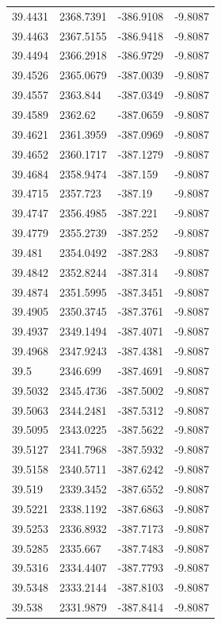 \begin{table}[H]
\begin{tabular}{llll}
39.4431 & 2368.7391 & -386.9108 & -9.8087 \\
39.4463 & 2367.5155 & -386.9418 & -9.8087 \\
39.4494 & 2366.2918 & -386.9729 & -9.8087 \\
39.4526 & 2365.0679 & -387.0039 & -9.8087 \\
39.4557 & 2363.844 & -387.0349 & -9.8087 \\
39.4589 & 2362.62 & -387.0659 & -9.8087 \\
39.4621 & 2361.3959 & -387.0969 & -9.8087 \\
39.4652 & 2360.1717 & -387.1279 & -9.8087 \\
39.4684 & 2358.9474 & -387.159 & -9.8087 \\
39.4715 & 2357.723 & -387.19 & -9.8087 \\
39.4747 & 2356.4985 & -387.221 & -9.8087 \\
39.4779 & 2355.2739 & -387.252 & -9.8087 \\
39.481 & 2354.0492 & -387.283 & -9.8087 \\
39.4842 & 2352.8244 & -387.314 & -9.8087 \\
39.4874 & 2351.5995 & -387.3451 & -9.8087 \\
39.4905 & 2350.3745 & -387.3761 & -9.8087 \\
39.4937 & 2349.1494 & -387.4071 & -9.8087 \\
39.4968 & 2347.9243 & -387.4381 & -9.8087 \\
39.5 & 2346.699 & -387.4691 & -9.8087 \\
39.5032 & 2345.4736 & -387.5002 & -9.8087 \\
39.5063 & 2344.2481 & -387.5312 & -9.8087 \\
39.5095 & 2343.0225 & -387.5622 & -9.8087 \\
39.5127 & 2341.7968 & -387.5932 & -9.8087 \\
39.5158 & 2340.5711 & -387.6242 & -9.8087 \\
39.519 & 2339.3452 & -387.6552 & -9.8087 \\
39.5221 & 2338.1192 & -387.6863 & -9.8087 \\
39.5253 & 2336.8932 & -387.7173 & -9.8087 \\
39.5285 & 2335.667 & -387.7483 & -9.8087 \\
39.5316 & 2334.4407 & -387.7793 & -9.8087 \\
39.5348 & 2333.2144 & -387.8103 & -9.8087 \\
39.538 & 2331.9879 & -387.8414 & -9.8087 \\

\end{tabular}
\end{table}
